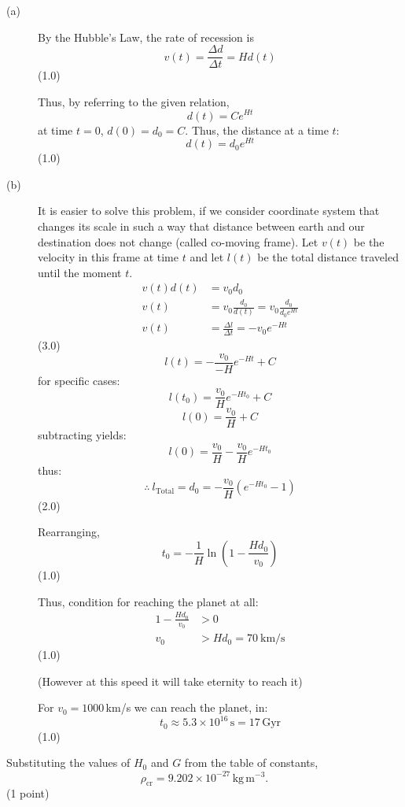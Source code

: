 \begin{description}
\item[(a)] By the Hubble's Law, the rate of recession is
  \[ v(t) = \frac{\Delta d}{\Delta t} = H d(t) \]
  \hfill(1.0)

  Thus, by referring to the given relation,
  \[ d(t) = C e^{Ht} \]
  at time $t = 0$, $d(0) = d_0 = C$. Thus, the distance at a time $t$:
  \[ d(t) = d_0 e^{Ht} \]
  \hfill(1.0)

\item[(b)] It is easier to solve this problem, if we consider coordinate
  system that changes its scale in such a way that distance between earth
  and our destination does not change (called co-moving frame). Let $v(t)$
  be the velocity in this frame at time $t$ and let $l(t)$ be the total
  distance traveled until the moment $t$.
  \begin{align*}
  v(t)d(t) &= v_0 d_0\\
  v(t) &= v_0\frac{d_0}{d(t)} = v_0\frac{d_0}{d_0 e^{Ht}}\\
  v(t) &= \frac{\Delta l}{\Delta t} = -v_0 e^{-Ht}
  \end{align*}
  \hfill(3.0)
  \[ l(t) = -\frac{v_0}{-H}e^{-Ht} + C \]
  for specific cases:
  \[ l(t_0) = \frac{v_0}{H}e^{-Ht_0} + C \]
  \[ l(0) = \frac{v_0}{H} + C \]
  subtracting yields:
  \[ l(0) = \frac{v_0}{H} - \frac{v_0}{H}e^{-Ht_0} \]
  thus:
  \[ \therefore\ l_{\mathrm{Total}} = d_0 = -\frac{v_0}{H}(e^{-Ht_0} - 1) \]
  \hfill(2.0)

  Rearranging,
  \[ t_0 = -\frac{1}{H}\ln\left(1 - \frac{H d_0}{v_0}\right) \]
  \hfill(1.0)

  Thus, condition for reaching the planet at all:
  \begin{align*}
  1 - \frac{H d_0}{v_0} &> 0\\
  v_0 &> H d_0 = 70\ \mathrm{km/s}
  \end{align*}
  \hfill(1.0)

  (However at this speed it will take eternity to reach it)

  For $v_0 = 1000$\,km/s we can reach the planet, in:
  \[ t_0 \approx 5.3\times 10^{16}\,\mathrm{s} = 17\,\mathrm{Gyr} \]
  \hfill(1.0)
\end{description}

Substituting the values of $H_0$ and $G$ from the table of constants,
\[ \rho_{\mathrm{cr}} = 9.202\times 10^{-27}\,\mathrm{kg\,m^{-3}}. \]
\hfill(1 point)

